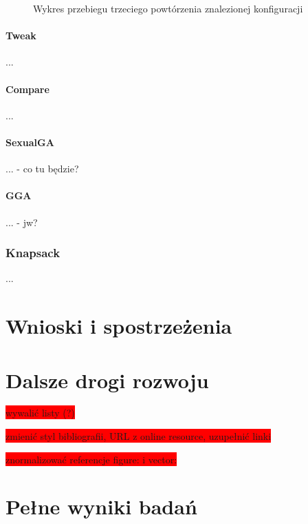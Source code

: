 \documentclass[twoside]{iisthesis}
\newcommand{\todo}{\colorbox{red}}
\newcommand{\graph}[1]{\centering }
\begin{document}
\begin{figure}[h]
	\caption{Wykres przebiegu trzeciego powtórzenia znalezionej konfiguracji \label{figure:tsp_init_example}}
	\graph{tsp_init_example.tex}
\end{figure}

\subsubsection{Tweak}
...
\subsubsection{Compare}
...
\subsubsection{SexualGA}
... - co tu będzie?
\subsubsection{GGA}
... - jw?
\subsection{Knapsack}
...


\chapter{Wnioski i spostrzeżenia}
\chapter{Dalsze drogi rozwoju}



\pagestyle{plain}

\todo{wywalić listy (?)}

\todo{zmienić styl bibliografii, URL z online resource, uzupełnić linki}

\todo{znormalizować referencje figure: i vector:}

\listoffigures
\listoftables
{}




\appendix \chapter{Pełne wyniki badań}
\end{document}
